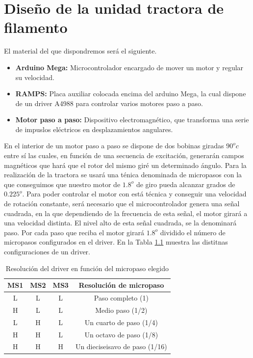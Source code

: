 
\chapter{Diseño de la unidad tractora de filamento}
\label{ane:tractora}
El material del que dispondremos será el siguiente.

\begin{itemize}
	\item{\textbf{Arduino Mega:} Microcontrolador encargado de mover un motor y regular su velocidad.}
	\item{\textbf{RAMPS:} Placa auxiliar colocada encima del arduino Mega, la cual dispone de un driver A4988 para controlar varios motores paso a paso.}
	\item{\textbf{Motor paso a paso:} Dispositivo electromagnético, que transforma una serie de impuslos eléctricos en desplazamientos angulares.}
\end{itemize}

En el interior de un motor paso a paso se dispone de dos bobinas giradas $90^oc$ entre sí \cite{pasoapaso} las cuales, en función de una secuencia de excitación, generarán campos magnéticos que hará que el rotor del mismo giré un determinado ángulo. Para la realización de la tractora se usará una ténica denominada de micropasos con la que conseguimos que nuestro motor de $1.8^o$ de giro pueda alcanzar grados de $0.225^o$. Para poder controlar el motor con está técnica y conseguir una velocidad de rotación constante, será necesario que el microcontrolador genera una señal cuadrada, en la que dependiendo de la frecuencia de esta señal, el motor girará a una velocidad distinta. El nivel alto de esta señal cuadrada, se la denominará paso. Por cada paso que reciba el motor girará $1.8^o $ dividido el número de micropasos configurados en el driver. En la Tabla \ref{tab:res_drive} muestra las distitnas configuraciones de un driver.

\begin{table}[H]
    \centering
    \begin{tabular}{cccc}
        {\bf MS1} & {\bf MS2} & {\bf MS3} & {\bf Resolución de micropaso}  \\
        \hline
        L         & L         & L         & Paso completo (1)              \\
        H         & L         & L         & Medio paso (1/2)               \\
        L         & H         & L         & Un cuarto de paso (1/4)        \\
        H         & H         & L         & Un octavo de paso (1/8)        \\
        H         & H         & H         & Un dieciseisavo de paso (1/16)
    \end{tabular}
    \caption{Resolución del driver en función del micropaso elegido}
    \label{tab:res_drive}
\end{table}

